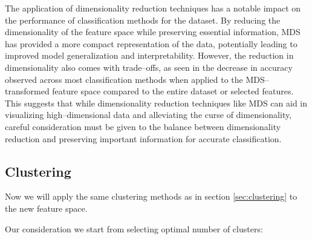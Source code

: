 \documentclass[11pt,a4paper]{article}\usepackage[]{graphicx}\usepackage[]{xcolor}
\begin{document}
The application of dimensionality reduction techniques has a notable impact on the performance of classification methods for the dataset. By reducing the dimensionality of the feature space while preserving essential information, MDS has provided a more compact representation of the data, potentially leading to improved model generalization and interpretability. However, the reduction in dimensionality also comes with trade--offs, as seen in the decrease in accuracy observed across most classification methods when applied to the MDS--transformed feature space compared to the entire dataset or selected features. This suggests that while dimensionality reduction techniques like MDS can aid in visualizing high--dimensional data and alleviating the curse of dimensionality, careful consideration must be given to the balance between dimensionality reduction and preserving important information for accurate classification. 












  \subsection{Clustering}
  
  Now we will apply the same clustering methods as in section \ref{sec:clustering} to the new feature space.
  
  Our consideration we start from selecting optimal number of clusters:
  
\end{document}
